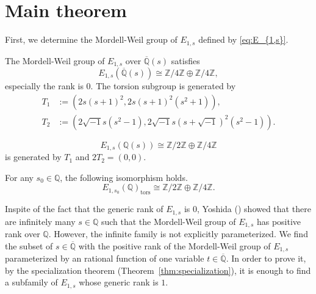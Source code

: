 \documentclass[main]{subfiles}
\begin{document}
\section{Main theorem}
First, we determine the Mordell-Weil group of $E_{1,s}$ defined by \eqref{eq:E_{1,s}}.

\begin{thm}
    \label{thm:E_{1,s}}
    The Mordell-Weil group of $E_{1,s}$ over $\overline{\mathbb{Q}}(s)$ satisfies
    \begin{equation*}
        E_{1,s}(\overline{\mathbb{Q}}(s)) \cong \mathbb{Z} / 4 \mathbb{Z} \oplus \mathbb{Z} / 4 \mathbb{Z},
    \end{equation*}
    especially the rank is $0$. The torsion subgroup is generated by
    \begin{align}
        T_1 & := (2s(s+1)^2, 2s(s+1)^2(s^2+1)),                              \\
        T_2 & := (2 \sqrt{-1} s(s^2-1),2 \sqrt{-1} s(s+\sqrt{-1})^2(s^2-1)).
    \end{align}
\end{thm}

\begin{cor}
    \label{cor:E_{1,s}}
    \begin{equation*}
        E_{1,s}(\mathbb{Q}(s)) \cong \mathbb{Z} / 2 \mathbb{Z} \oplus \mathbb{Z} / 4 \mathbb{Z}
    \end{equation*}
    is generated by $T_1$ and $2T_2=(0,0)$.
\end{cor}

\begin{thm}
    For any $s_0 \in \mathbb{Q}$, the following isomorphism holds.
    \begin{equation*}
        E_{1,s_0}(\mathbb{Q})_{\text{tors}} \cong \mathbb{Z} / 2 \mathbb{Z} \oplus \mathbb{Z} / 4 \mathbb{Z}.
    \end{equation*}
\end{thm}

Inspite of the fact that the generic rank of $E_{1,s}$ is $0$, Yoshida (\cite[Corollary 4.7.]{ref:yoshida}) showed that there are infinitely many $s \in \mathbb{Q}$ such that the Mordell-Weil group of $E_{1,s}$ has positive rank over $\mathbb{Q}$.
However, the infinite family is not explicitly parameterized.
We find the subset of $s \in \overline{{\mathbb{Q}}}$ with the positive rank of the Mordell-Weil group of $E_{1,s}$ parameterized by an rational function of one variable $t \in \overline{\mathbb{Q}}$.
In order to prove it, by the specialization theorem (Theorem~\ref{thm:specialization}), it is enough to find a subfamily of $E_{1,s}$ whose generic rank is $1$.
\end{document}
